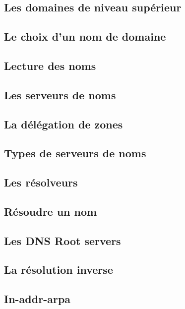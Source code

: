 \documentclass[12pt]{article}
\begin{document}
\subsection{Les domaines de niveau supérieur}


\subsection{Le choix d’un nom de domaine}


\subsection{Lecture des noms}


\subsection{Les serveurs de noms}


\subsection{La délégation de zones}


\subsection{Types de serveurs de noms}


\subsection{Les résolveurs}


\subsection{Résoudre un nom}


\subsection{Les DNS Root servers}


\subsection{La résolution inverse}


\subsection{In-addr-arpa}
\end{document}

